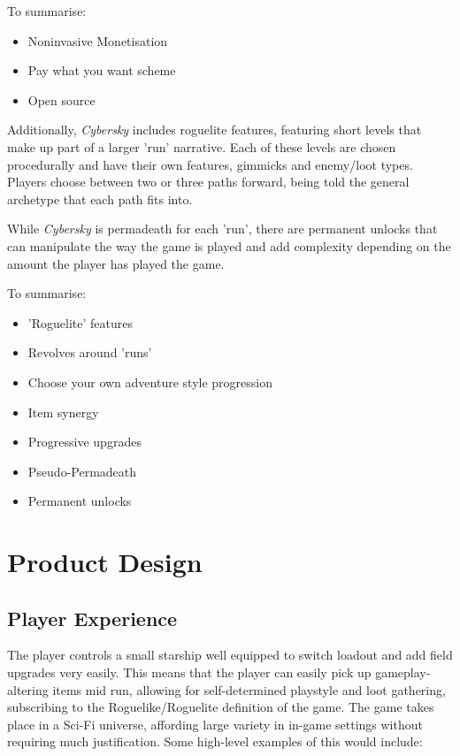 \documentclass{scrartcl}
\begin{document}
To summarise:

\begin{itemize}
  \item Noninvasive Monetisation
  \item Pay what you want scheme
  \item Open source
\end{itemize}

Additionally, \emph{Cybersky} includes roguelite features, featuring short levels that make up part of a larger 'run' narrative. Each of these levels are chosen procedurally and have their own features, gimmicks and enemy/loot types. Players choose between two or three paths forward, being told the general archetype that each path fits into.

While \emph{Cybersky} is permadeath for each 'run', there are permanent unlocks that can manipulate the way the game is played and add complexity depending on the amount the player has played the game.

To summarise:

\begin{itemize}
  \item 'Roguelite' features
  \item Revolves around 'runs'
  \item Choose your own adventure style progression
  \item Item synergy
  \item Progressive upgrades
  \item Pseudo-Permadeath
  \item Permanent unlocks
\end{itemize}

\section{
  Product Design
 }

\subsection{Player Experience}

The player controls a small starship well equipped to switch loadout and add field upgrades very easily. This means that the player can easily pick up gameplay-altering items mid run, allowing for self-determined playstyle and loot gathering, subscribing to the Roguelike/Roguelite definition of the game. The game takes place in a Sci-Fi universe, affording large variety in in-game settings without requiring much justification. Some high-level examples of this would include:
\end{document}

